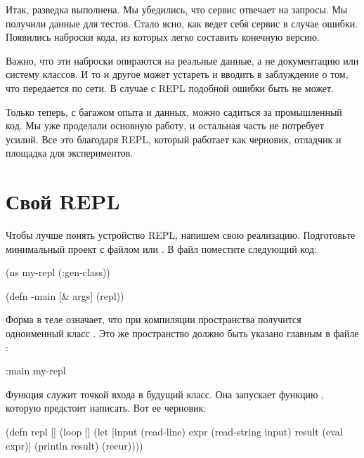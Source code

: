 Итак, разведка выполнена. Мы убедились, что сервис отвечает на запросы. Мы получили данные для тестов. Стало ясно, как ведет себя сервис в случае ошибки. Появились наброски кода, из которых легко составить конечную версию.

Важно, что эти наброски опираются на реальные данные, а не документацию или систему классов. И то и другое может устареть и вводить в заблуждение о том, что передается по сети. В случае с REPL подобной ошибки быть не может.

Только теперь, с багажом опыта и данных, можно садиться за промышленный код. Мы уже проделали основную работу, и остальная часть не потребует усилий. Все это благодаря REPL, который работает как черновик, отладчик и площадка для экспериментов.

\section{Свой REPL}

Чтобы лучше понять устройство REPL, напишем свою реализацию. Подготовьте минимальный проект с файлом  или . В файл  поместите следующий код:

\begin{english}
  \begin{clojure/lines}
(ns my-repl
  (:gen-class))

(defn -main [& args]
  (repl))
  \end{clojure/lines}
\end{english}

Форма  в теле  означает, что при компиляции пространства получится одноименный класс . Это же пространство должно быть указано главным в файле :

\begin{english}
  \begin{clojure}
:main my-repl
  \end{clojure}
\end{english}

Функция  служит точкой входа в будущий класс. Она запускает функцию , которую предстоит написать. Вот ее черновик:

\begin{english}
  \begin{clojure}
(defn repl []
  (loop []
    (let [input (read-line)
          expr (read-string input)
          result (eval expr)]
      (println result)
      (recur))))
  \end{clojure}
\end{english}

